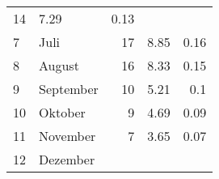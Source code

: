 \begin{longtable}{lXrrr}
       \num{14} &
       \num[round-mode=places,round-precision=2]{7.29} &
         \num[round-mode=places,round-precision=2]{0.13} \\

     7 &
     \multicolumn{1}{X}{ Juli   } &


       \num{17} &
       \num[round-mode=places,round-precision=2]{8.85} &
         \num[round-mode=places,round-precision=2]{0.16} \\

     8 &
     \multicolumn{1}{X}{ August   } &


       \num{16} &
       \num[round-mode=places,round-precision=2]{8.33} &
         \num[round-mode=places,round-precision=2]{0.15} \\

     9 &
     \multicolumn{1}{X}{ September   } &


       \num{10} &
       \num[round-mode=places,round-precision=2]{5.21} &
         \num[round-mode=places,round-precision=2]{0.1} \\

     10 &
     \multicolumn{1}{X}{ Oktober   } &


       \num{9} &
       \num[round-mode=places,round-precision=2]{4.69} &
         \num[round-mode=places,round-precision=2]{0.09} \\

     11 &
     \multicolumn{1}{X}{ November   } &


       \num{7} &
       \num[round-mode=places,round-precision=2]{3.65} &
         \num[round-mode=places,round-precision=2]{0.07} \\

     12 &
     \multicolumn{1}{X}{ Dezember   } &



\end{longtable}
